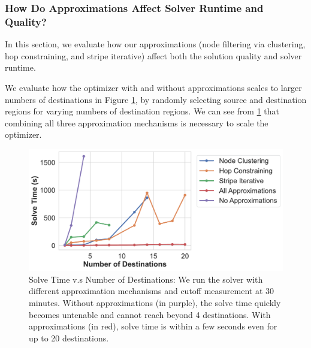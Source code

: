 \subsubsection{How Do Approximations Affect Solver Runtime and Quality?} 
\label{sec:solution_qual_eval}

In this section, we evaluate how our approximations (node filtering via clustering, hop constraining, and stripe iterative) affect both the solution quality and solver runtime. 

We evaluate how the optimizer with and without approximations scales to larger numbers of destinations in Figure \ref{fig:solve_time}, by randomly selecting source and destination regions for varying numbers of destination regions. We can see from \cref{fig:solve_time} that combining all three approximation mechanisms is necessary to scale the optimizer. 


\begin{figure}[t]
    \centering
    \includegraphics[width=\linewidth]{figures/solve_time_versus_num_dest.pdf}
    \caption{Solve Time v.s Number of Destinations: We run the solver with different approximation mechanisms and cutoff measurement at 30 minutes. Without approximations (in purple), the solve time quickly becomes untenable and cannot reach beyond 4 destinations. With approximations (in red), solve time is within a few seconds even for up to 20 destinations. }
    \label{fig:solve_time}
\end{figure}

